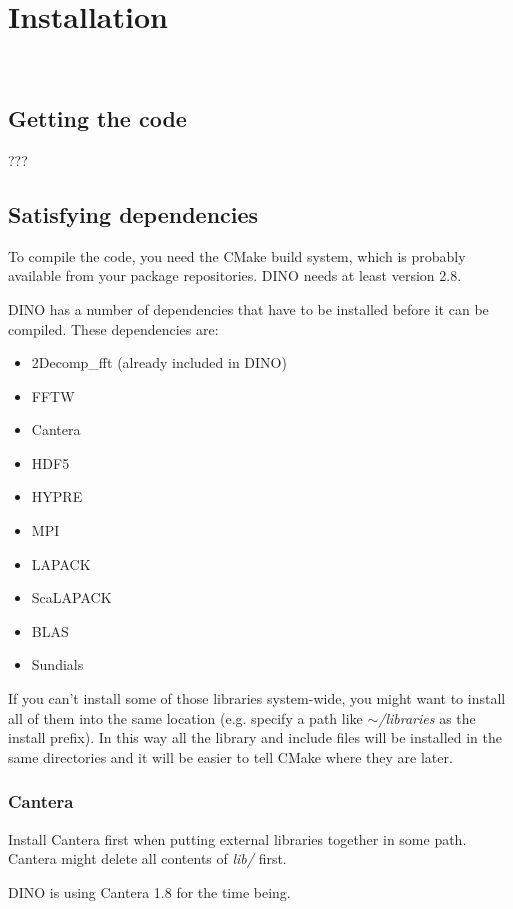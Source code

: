 \section{Installation} 
\label{Installation}
\subsection{Getting the code}
???
\subsection{Satisfying dependencies}
To compile the code, you need the CMake build system, which is probably available from your package repositories. DINO needs at least version 2.8.

DINO has a number of dependencies that have to be installed before it can be compiled. These dependencies are:
\begin{itemize}
\item 2Decomp\_fft (already included in DINO)
\item FFTW
\item Cantera
\item HDF5
\item HYPRE
\item MPI
\item LAPACK
\item ScaLAPACK
\item BLAS
\item Sundials
\end{itemize}
If you can't install some of those libraries system-wide, you might want to install all of them into the same location (e.g. specify a path like $\sim$\textit{/libraries} as the install prefix). In this way all the library and include files will be installed in the same directories and it will be easier to tell CMake where they are later.

\subsubsection{Cantera}
Install Cantera first when putting external libraries together in some path. Cantera might delete all contents of \textit{lib/} first.

DINO is using Cantera 1.8 for the time being.

